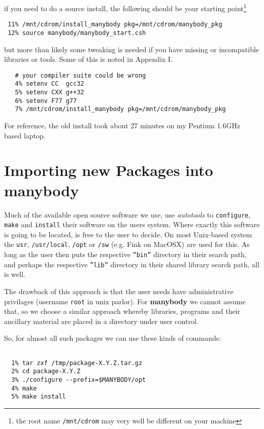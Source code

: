 if you need to do a source install, the following should be 
your starting point\footnote{the root name {\tt /mnt/cdrom} may
very well be different on your machine}

\footnotesize\begin{verbatim}
 11% /mnt/cdrom/install_manybody pkg=/mnt/cdrom/manybody_pkg
 12% source manybody/manybody_start.csh
\end{verbatim}\normalsize

but more than likely some tweaking is needed if you have missing or
incompatible libraries or tools. Some of this is noted in Appendix I.


\footnotesize\begin{verbatim}
   # your compiler suite could be wrong
   4% setenv CC  gcc32
   5% setenv CXX g++32
   6% setenv F77 g77
   7% /mnt/cdrom/install_manybody pkg=/mnt/cdrom/manybody_pkg
\end{verbatim}\normalsize


For reference, the old install took about 27 minutes on my Pentium 1.6GHz based
laptop.

\section{Importing new Packages into manybody}

Much of the available open source software we use, use
{\it autotools} to {\tt configure}, {\tt make} and {\tt install} their
software on the users system. Where exactly this software is going to be located,
is free to the user to decide. On most Unix-based system the {\tt usr},
{\tt /usr/local}, {\tt /opt} or {\tt /sw} (e.g. Fink on MacOSX) are used for this.
As long
as the user then puts the respective {\tt ''bin''} directory in their search
path, and perhaps the respective {\tt ''lib''}  directory in their 
shared library search path, all is well.

The drawback of this approach is that the user needs have administrative
privilages (username {\tt root} in unix parlor). For {\bf manybody} we
cannot assume that, so we choose a similar approach whereby libraries, programs
and their ancillary material are placed in a directory under user control.


So, for almost all such packages we can use these kinds of commands:

\footnotesize\begin{verbatim}

  1% tar zxf /tmp/package-X.Y.Z.tar.gz
  2% cd package-X.Y.Z
  3% ./configure --prefix=$MANYBODY/opt
  4% make
  5% make install

\end{verbatim}\normalsize

